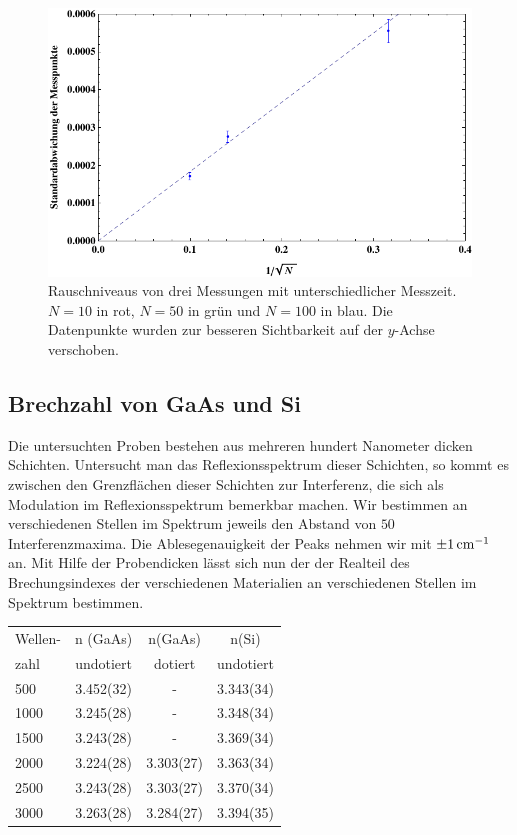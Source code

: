 \documentclass[paper=a4,fontsize=10pt,DIV=18,twocolumn,parskip=half]{scrartcl}
\numberwithin{equation}{section}    %
\begin{document}
\begin{figure}[htp]
	\begin{center}
		\includegraphics[width=\columnwidth]{Bilder/Rausch3}
		\caption{Rauschniveaus von drei Messungen mit unterschiedlicher Messzeit. $N=10$ in rot, $N=50$ in grün und $N=100$ in blau. Die Datenpunkte wurden zur besseren Sichtbarkeit auf der $y$-Achse verschoben. }
		\label{snr3}
	\end{center}
\end{figure}

\subsection{Brechzahl von GaAs und Si}
Die untersuchten Proben bestehen aus mehreren hundert Nanometer dicken 
Schichten.
Untersucht man das Reflexionsspektrum dieser Schichten, so kommt es zwischen den 
Grenzflächen dieser Schichten zur Interferenz, die sich als Modulation im 
Reflexionsspektrum bemerkbar machen.  Wir bestimmen an verschiedenen Stellen im 
Spektrum jeweils den Abstand von $50$ Interferenzmaxima. Die Ablesegenauigkeit 
der Peaks nehmen wir mit $\SI{\pm 1}{\centi\meter^{-1}}$ an.
Mit Hilfe der Probendicken lässt sich nun der der Realteil des Brechungsindexes 
der verschiedenen Materialien an verschiedenen Stellen im Spektrum bestimmen.

\begin{tabular}{ l | c c c }
  Wellen- & n (GaAs) & n(GaAs)&n(Si)\\
  zahl & undotiert & dotiert & undotiert \\
  \hline
  500 & 3.452(32) & - & 3.343(34) \\
  1000 & 3.245(28) & - & 3.348(34) \\
  1500 & 3.243(28) & - & 3.369(34) \\
  2000 & 3.224(28) & 3.303(27) & 3.363(34) \\
  2500 & 3.243(28) & 3.303(27) & 3.370(34) \\
  3000 & 3.263(28) & 3.284(27) & 3.394(35) \\
\end{tabular}
\end{document}

